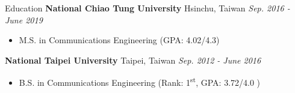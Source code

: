 \documentclass{resume} %
\newcommand{\ts}{\textsuperscript}
\begin{document}

\begin{rSection}{Education}
{\bf National Chiao Tung University} \hfill {Hsinchu, Taiwan} \hfill {\em Sep. 2016 - June 2019}
\begin{itemize} \item {M.S. in Communications Engineering (GPA: 4.02/4.3)} \end{itemize}
{\bf National Taipei University} \hfill {Taipei, Taiwan} \hfill {\em Sep. 2012 - June 2016}
\begin{itemize} \item {B.S. in Communications Engineering (Rank: 1\ts{st}, GPA: 3.72/4.0 )} \end{itemize}
\end{rSection}
\end{document}
